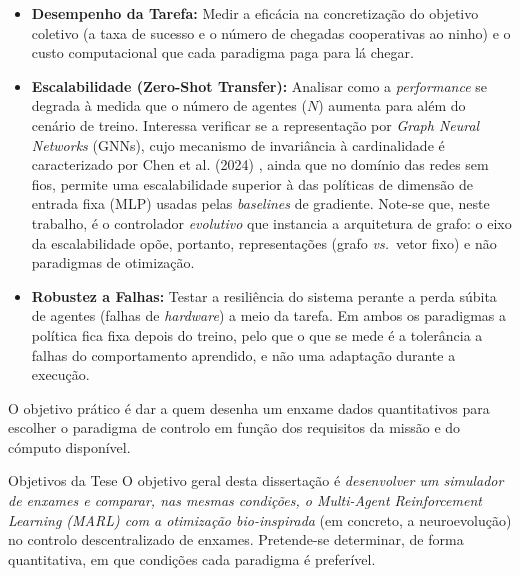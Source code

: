 \documentclass[12pt,reqno, twoside]{amsbook}
\makeatletter
\def\section{\@startsection{section}{1}%
      \z@{.5\linespacing\@plus.7\linespacing}{.25\linespacing}%
      {\normalfont\bfseries\flushleft}}
\theoremstyle{plain}
\numberwithin{equation}{chapter}
\numberwithin{section}{chapter}
\numberwithin{table}{chapter}
\numberwithin{figure}{chapter}
\makeatother
\begin{document}
\begin{itemize}
    \item \textbf{Desempenho da Tarefa:} Medir a eficácia na concretização do objetivo coletivo (a taxa de sucesso e o número de chegadas cooperativas ao ninho) e o custo computacional que cada paradigma paga para lá chegar.
    \item \textbf{Escalabilidade (Zero-Shot Transfer):} Analisar como a \textit{performance} se degrada à medida que o número de agentes ($N$) aumenta para além do cenário de treino. Interessa verificar se a representação por \textit{Graph Neural Networks} (GNNs), cujo mecanismo de invariância à cardinalidade é caracterizado por Chen et al. (2024) \cite{chen2024graph}, ainda que no domínio das redes sem fios, permite uma escalabilidade superior à das políticas de dimensão de entrada fixa (MLP) usadas pelas \textit{baselines} de gradiente. Note-se que, neste trabalho, é o controlador \emph{evolutivo} que instancia a arquitetura de grafo: o eixo da escalabilidade opõe, portanto, representações (grafo \textit{vs.}\ vetor fixo) e não paradigmas de otimização.
    \item \textbf{Robustez a Falhas:} Testar a resiliência do sistema perante a perda súbita de agentes (falhas de \textit{hardware}) a meio da tarefa. Em ambos os paradigmas a política fica fixa depois do treino, pelo que o que se mede é a tolerância a falhas do comportamento aprendido, e não uma adaptação durante a execução.
\end{itemize}

O objetivo prático é dar a quem desenha um enxame dados quantitativos para escolher o paradigma de controlo em função dos requisitos da missão e do cómputo disponível.

\section{Objetivos da Tese}
O objetivo geral desta dissertação é \emph{desenvolver um simulador de enxames e comparar, nas mesmas condições, o \textit{Multi-Agent Reinforcement Learning} (MARL) com a otimização bio-inspirada} (em concreto, a neuroevolução) no controlo descentralizado de enxames. Pretende-se determinar, de forma quantitativa, em que condições cada paradigma é preferível.
\end{document}
